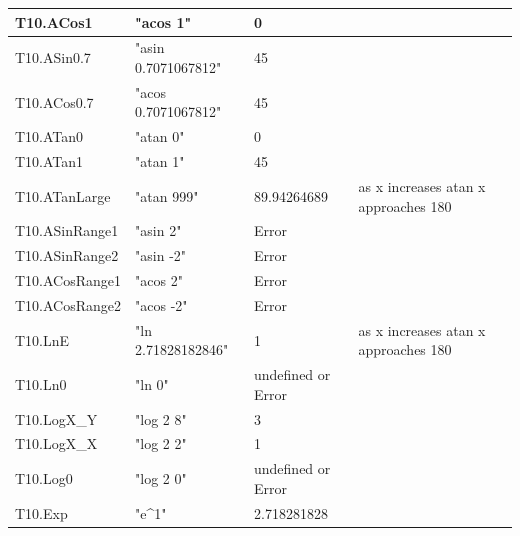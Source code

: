 \documentclass[a4paper, oneside, 11pt]{report}
\begin{document}
\begin{tabular}{|p{1.5in}|p{1.5in}|p{1.6in}|p{1.6in}|p{2.4in}|}
        \hline
        T10.ACos1        & "acos 1"                   & 0                                      &                                         \\
        \hline
        T10.ASin0.7      & "asin 0.7071067812"        & 45                                     &                                         \\
        \hline
        T10.ACos0.7      & "acos 0.7071067812"        & 45                                     &                                         \\
        \hline
        T10.ATan0        & "atan 0"                   & 0                                      &                                         \\
        \hline
        T10.ATan1        & "atan 1"                   & 45                                     &                                         \\
        \hline
        T10.ATanLarge    & "atan 999"                 & 89.94264689                            & as x increases atan x approaches 180    \\
        \hline
        T10.ASinRange1   & "asin 2"                   & Error                                  &                                         \\
        \hline
        T10.ASinRange2   & "asin -2"                  & Error                                  &                                         \\
        \hline
        T10.ACosRange1   & "acos 2"                   & Error                                  &                                         \\
        \hline
        T10.ACosRange2   & "acos -2"                  & Error                                  &                                         \\
        \hline
        T10.LnE          & "ln 2.71828182846"        & 1                                      & as x increases atan x approaches 180    \\
        \hline
        T10.Ln0          & "ln 0"                    & undefined or Error                     &                                         \\
        \hline
        T10.LogX\_Y      & "log 2 8"                 & 3                                      &                                         \\
        \hline
        T10.LogX\_X      & "log 2 2"                 & 1                                      &                                         \\
        \hline
        T10.Log0         & "log 2 0"                 & undefined or Error                     &                                         \\
        \hline
        T10.Exp          & "e\^{}1"                   & 2.718281828                            &                                         \\
        \hline
    \end{tabular}
\end{document}
